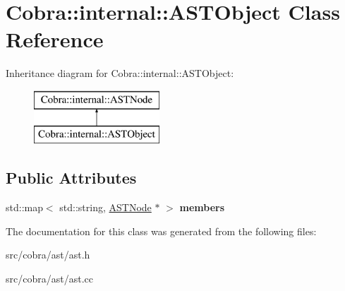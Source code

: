 \hypertarget{class_cobra_1_1internal_1_1_a_s_t_object}{\section{Cobra\+:\+:internal\+:\+:A\+S\+T\+Object Class Reference}
\label{class_cobra_1_1internal_1_1_a_s_t_object}
}
Inheritance diagram for Cobra\+:\+:internal\+:\+:A\+S\+T\+Object\+:\begin{figure}[H]
\begin{center}
\leavevmode
\includegraphics[height=2.000000cm]{class_cobra_1_1internal_1_1_a_s_t_object}
\end{center}
\end{figure}
\subsection*{Public Attributes}
\begin{DoxyCompactItemize}
\item 
\hypertarget{class_cobra_1_1internal_1_1_a_s_t_object_ad6a21e13650d502c0fcb35aa8b14f20a}{std\+::map$<$ std\+::string, \hyperlink{class_cobra_1_1internal_1_1_a_s_t_node}{A\+S\+T\+Node} $\ast$ $>$ {\bfseries members}}\label{class_cobra_1_1internal_1_1_a_s_t_object_ad6a21e13650d502c0fcb35aa8b14f20a}

\end{DoxyCompactItemize}


The documentation for this class was generated from the following files\+:\begin{DoxyCompactItemize}
\item 
src/cobra/ast/ast.\+h\item 
src/cobra/ast/ast.\+cc\end{DoxyCompactItemize}
